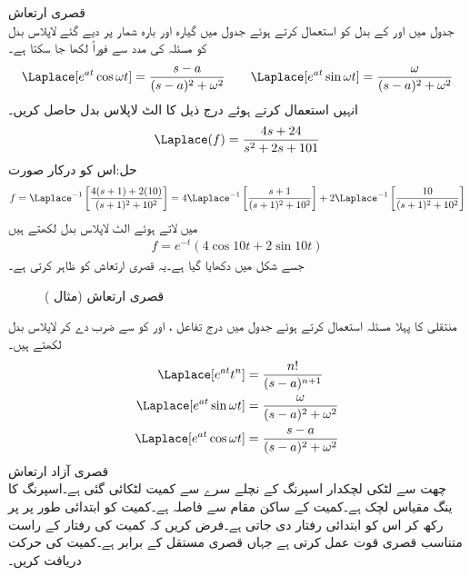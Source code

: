 \quad قصری ارتعاش\\
جدول  میں  اور  کے بدل کو استعمال کرتے ہوئے جدول میں گیارہ اور بارہ شمار پر دیے گئے لاپلاس بدل کو مسئلہ  کی مدد سے فوراً لکھا جا سکتا ہے۔
\begin{align*}
\Laplace[e^{at}\cos \omega t]=\frac{s-a}{(s-a)^2+\omega^2} \quad \quad \Laplace[e^{at}\sin \omega t]=\frac{\omega}{(s-a)^2+\omega^2}
\end{align*}
انہیں استعمال کرتے ہوئے درج ذیل کا الٹ لاپلاس بدل حاصل کریں۔
\begin{align*}
\Laplace(f)=\frac{4s+24}{s^2+2s+101}
\end{align*}
حل:اس کو درکار صورت
\begin{align*}
f=\Laplace^{-1}\left[\frac{4(s+1)+2(10)}{(s+1)^2+10^2}\right]=4\Laplace^{-1}\left[\frac{s+1}{(s+1)^2+10^2}\right]+2\Laplace^{-1}\left[\frac{10}{(s+1)^2+10^2}\right]
\end{align*}
 میں لاتے ہوئے الٹ لاپلاس بدل لکھتے ہیں
\begin{align*}
f=e^{-t}(4\cos 10t+2\sin 10t)
\end{align*}
 جسے شکل  میں دکھایا گیا ہے۔یہ قصری ارتعاش کو ظاہر کرتی ہے۔
\begin{figure}
\centering
{}
\caption{قصری ارتعاش (مثال )}
\label{شکل_لاپلاس_قصری_ارتعاش}
\end{figure}
منتقلی کا پہلا مسئلہ استعمال کرتے ہوئے جدول  میں درج  تفاعل ،  اور  کو  سے ضرب دے کر لاپلاس بدل لکھتے ہیں۔
\begin{align*}
\Laplace[e^{at}t^n]&=\frac{n!}{(s-a)^{n+1}}\\
\Laplace[e^{at}\sin \omega t]&=\frac{\omega}{(s-a)^2+\omega^2}\\
\Laplace[e^{at}\cos \omega t]&=\frac{s-a}{(s-a)^2+\omega^2}
\end{align*} 
\quad قصری آزاد ارتعاش\\
چھت سے لٹکی  لچکدار اسپرنگ کے نچلے سرے سے کمیت  لٹکائی گئی ہے۔اسپرنگ کا ینگ مقیاس لچک  ہے۔کمیت کے ساکن مقام سے فاصلہ   ہے۔کمیت کو ابتدائی طور پر  پر رکھ کر اس کو ابتدائی رفتار  دی جاتی ہے۔فرض کریں کہ کمیت کی رفتار کے راست متناسب قصری قوت عمل کرتی ہے جہاں قصری مستقل  کے برابر ہے۔کمیت کی حرکت دریافت کریں۔


